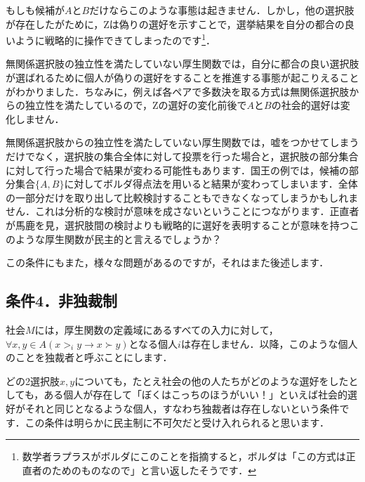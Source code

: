 もしも候補が$A$と$B$だけならこのような事態は起きません．しかし，他の選択肢が存在したがために，Zは偽りの選好を示すことで，選挙結果を自分の都合の良いように戦略的に操作できてしまったのです\footnote{数学者ラプラスがボルダにこのことを指摘すると，ボルダは「この方式は正直者のためのものなので」と言い返したそうです．}．

無関係選択肢の独立性を満たしていない厚生関数では，自分に都合の良い選択肢が選ばれるために個人が偽りの選好をすることを推進する事態が起こりえることがわかりました．ちなみに，例えば各ペアで多数決を取る方式は無関係選択肢からの独立性を満たしているので，Zの選好の変化前後で$A$と$B$の社会的選好は変化しません．

無関係選択肢からの独立性を満たしていない厚生関数では，嘘をつかせてしまうだけでなく，選択肢の集合全体に対して投票を行った場合と，選択肢の部分集合に対して行った場合で結果が変わる可能性もあります．国王の例では，候補の部分集合$\{A,B\}$に対してボルダ得点法を用いると結果が変わってしまいます．全体の一部分だけを取り出して比較検討することもできなくなってしまうかもしれません．これは分析的な検討が意味を成さないということにつながります．正直者が馬鹿を見，選択肢間の検討よりも戦略的に選好を表明することが意味を持つこのような厚生関数が民主的と言えるでしょうか？

この条件にもまた，様々な問題があるのですが，それはまた後述します．

\subsection*{条件4．非独裁制}
\begin{dfn}[非独裁制]
    社会$M$には，厚生関数の定義域にあるすべての入力に対して，$\forall x,y \in A (x >_i y \to x \succ y)$となる個人$i$は存在しません．以降，このような個人のことを独裁者と呼ぶことにします．
\end{dfn}
どの2選択肢$x,y$についても，たとえ社会の他の人たちがどのような選好をしたとしても，ある個人が存在して「ぼくはこっちのほうがいい！」といえば社会的選好がそれと同じとなるような個人，すなわち独裁者は存在しないという条件です．この条件は明らかに民主制に不可欠だと受け入れられると思います．

